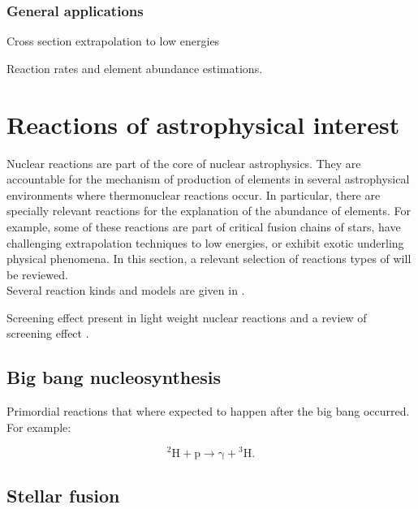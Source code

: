 \documentclass[openany]{book}
\begin{document}
\subsection{General applications} \label{sub:sfactorApplications}

Cross section extrapolation to low energies

Reaction rates and element abundance estimations. 

\chapter{Reactions of astrophysical interest}  \label{ch:reactionsInterest}

Nuclear reactions are part of the core of nuclear astrophysics. They are accountable for the mechanism of production of elements in several astrophysical environments where thermonuclear reactions occur. In particular, there are specially relevant reactions for the explanation of the abundance of elements. For example, some of these reactions are part of critical fusion chains of stars, have challenging extrapolation techniques to low energies, or  exhibit exotic underling physical phenomena.   In this section, a relevant selection of reactions types of will be reviewed. \\

Several reaction kinds and models are given in \cite{descouvemont_2020}.

Screening effect present in light weight nuclear reactions \cite{raiola_migliardi_gyurky_aliotta_formicola_bonetti_broggini_campajola_corvisiero_costantini_et_2002} and a review of screening effect \cite{assenbaum_langanke_rolfs_1987}.

\section{Big bang nucleosynthesis} \label{sec:BBN}

Primordial reactions that where expected to happen after the big bang occurred. For example:

\begin{equation} \label{eq:reaction_2Hpradiative}
	\mathrm{{}^{2}H + p \rightarrow \gamma + {}^{3}H}.
\end{equation}

\section{Stellar fusion}  \label{sec:StellarFusion}
\end{document}
